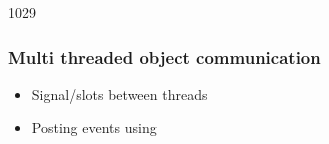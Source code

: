 \begin{slide}{1029}\frametitle{Multi threaded object communication}
  \begin{itemize}
  \item Signal/slots between threads
  \item Posting events using 
  \end{itemize}
\end{slide}

